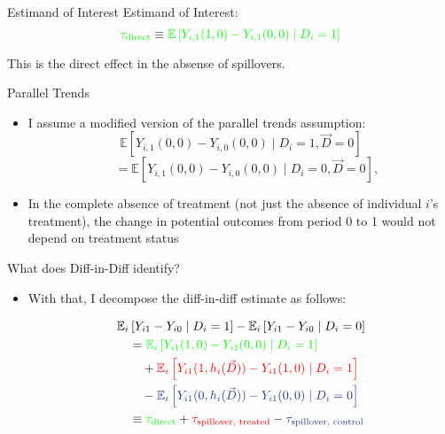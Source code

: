 \documentclass[aspectratio=169]{beamer}
\begin{document}
\begin{frame}{Estimand of Interest}
    Estimand of Interest: \[ 
        \textcolor{green}{\tau_{\text{direct}}} \equiv \textcolor{green}{\mathbb{E}\left[ Y_{i,1}(1, 0) - Y_{i,1}(0, 0) \mid D_i = 1\right]}
    \]

    This is the direct effect in the absense of spillovers.
\end{frame}

\begin{frame}{Parallel Trends}
    \begin{itemize}
        \item I assume a modified version of the parallel trends assumption: \[
            \mathbb{E}\left[ Y_{i,1}(0, 0) - Y_{i,0}(0, 0) \mid D_i = 1, \vec{D} = 0 \right] 
        \] \[
            \quad =
            \mathbb{E}\left[ Y_{i,1}(0, 0) - Y_{i,0}(0, 0) \mid D_i = 0, \vec{D} = 0 \right],
        \]

        \item In the complete absence of treatment (not just the absence of individual $i$'s treatment), the change in potential outcomes from period 0 to 1 would not depend on treatment status
    \end{itemize}
\end{frame}

\begin{frame}{What does Diff-in-Diff identify?}
    \begin{itemize}
        \item With that, I decompose the diff-in-diff estimate as follows: 
        
        \begin{align*}
            &\mathbb{E}_i \left[ Y_{i1} - Y_{i0} \mid D_i = 1 \right] - \mathbb{E}_i \left[ Y_{i1} - Y_{i0} \mid D_i = 0 \right] \\
            &\quad = 
            \textcolor{green}{\mathbb{E}_i \left[ Y_{i1}(1, 0) - Y_{i1}(0, 0) \mid D_i = 1 \right]} \\
            &\quad\quad + 
            \textcolor{red}{\mathbb{E}_i \left[ Y_{i1}(1, h_i(\vec{D})) - Y_{i1}(1, 0) \mid D_i = 1 \right]} \\ 
            &\quad\quad - 
            \textcolor{purple}{\mathbb{E}_i \left[ Y_{i1}(0, h_i(\vec{D})) - Y_{i1}(0, 0) \mid D_i = 0 \right]} \\
            &\quad \equiv \textcolor{green}{\tau_{\text{direct}}} + \textcolor{red}{\tau_{\text{spillover, treated}}} - \textcolor{purple}{\tau_{\text{spillover, control}}}
        \end{align*}

    \end{itemize}
\end{frame}
\end{document}
